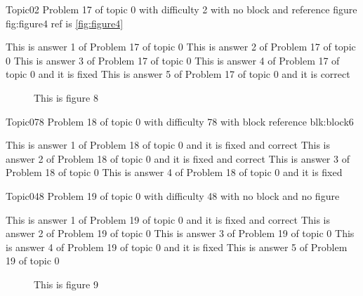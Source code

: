 \documentclass[master]{exam}
\begin{document}
\begin{problem}{Topic0}{2}
	Problem 17 of topic 0 with difficulty 2 with no block and reference figure fig:figure4 ref is \ref{fig:figure4}
	\begin{answers}
		\answer This is answer 1 of Problem 17 of topic 0 
		\answer This is answer 2 of Problem 17 of topic 0 
		\answer This is answer 3 of Problem 17 of topic 0 
		\answer[fixed] This is answer 4 of Problem 17 of topic 0 and it is fixed
		\answer[correct] This is answer 5 of Problem 17 of topic 0 and it is correct
	\end{answers}
\end{problem}



\begin{figure}
	\begin{center}
		This is figure 8 
		\label{fig:figure8}
	\end{center}
\end{figure}

\begin{problem}[requires=blk:block6]{Topic0}{78}
	Problem 18 of topic 0 with difficulty 78 with block reference blk:block6
	\begin{answers}
		 This is answer 1 of Problem 18 of topic 0 and it is fixed and correct
		 This is answer 2 of Problem 18 of topic 0 and it is fixed and correct
		\answer This is answer 3 of Problem 18 of topic 0 
		\answer[fixed] This is answer 4 of Problem 18 of topic 0 and it is fixed
	\end{answers}
\end{problem}

\begin{problem}{Topic0}{48}
	Problem 19 of topic 0 with difficulty 48 with no block and no figure
	\begin{answers}
		 This is answer 1 of Problem 19 of topic 0 and it is fixed and correct
		\answer This is answer 2 of Problem 19 of topic 0 
		\answer This is answer 3 of Problem 19 of topic 0 
		\answer[fixed] This is answer 4 of Problem 19 of topic 0 and it is fixed
		\answer This is answer 5 of Problem 19 of topic 0 
	\end{answers}
\end{problem}



\begin{figure}
	\begin{center}
		This is figure 9 
		\label{fig:figure9}
	\end{center}
\end{figure}
\end{document}
